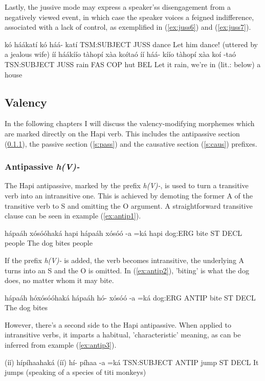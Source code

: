 \documentclass[a4paper, 12pt, oneside]{memoir}
\newcommand{\emh}[1]{\textit{#1}}
\begin{document}
Lastly, the jussive mode may express a speaker'ss disengagement from a negatively viewed event, in which case the speaker voices a feigned indifference, associated with a lack of control, as exemplified in (\ref{ex:juss6}) and (\ref{ex:juss7}).
\begin{examples}
    \ex \label{ex:juss6}
    \words kó háákatí
    \bits kó háá- katí
    \gloss TSM:SUBJECT JUSS dance
    \tr Let him dance! (uttered by a jealous wife) 
    \ex \label{ex:juss7}
    \words íí háákíío tàhopí xàa koítaó
    \bits íí háá- kíío tàhopí xàa koí -taó 
    \gloss TSN:SUBJECT JUSS rain FAS COP hut BEL
    \tr Let it rain, we're in (lit.: below) a house
\end{examples}
\subsection{Valency}\label{svvalency}
In the following chapters I will discuss the valency-modifying morphemes which are marked directly on the Hapi verb. This includes the antipassive section (\ref{s:antip}), the passive section (\ref{s:pass}) and the causative section (\ref{s:caus}) prefixes. 
\subsubsection{Antipassive \emh{h(V)-}}\label{s:antip}
The Hapi antipassive, marked by the prefix \emh{h(V)-}, is used to turn a transitive verb into an intransitive one. This is achieved by demoting the former A of the transitive verb to S and omitting the O argument. A straightforward transitive clause can be seen in example (\ref{ex:antip1}).
\begin{examples}
    \ex \label{ex:antip1}
    \words hápaáh xósóóhaká hapi
    \bits hápaáh xósóó -a =ká hapi
    \gloss dog:ERG bite ST DECL people
    \tr The dog bites people
\end{examples}
If the prefix \emh{h(V)-} is added, the verb becomes intransitive, the underlying A turns into an S and the O is omitted. In (\ref{ex:antip2}), 'biting' is what the dog does, no matter whom it may bite.
\begin{examples} 
    \ex \label{ex:antip2}
    \words hápaáh hóxósóóhaká
    \bits hápaáh hó- xósóó -a =ká 
    \gloss dog:ERG ANTIP bite ST DECL
    \tr The dog bites
\end{examples}
However, there's a second side to the Hapi antipassive. When applied to intransitive verbs, it imparts a habitual, 'characteristic' meaning, as can be inferred from example (\ref{ex:antip3}).
\begin{examples}
    \ex \label{ex:antip3}
    \words (íí) hípíhaahaká
    \bits (íí) hí- píhaa -a =ká
    \gloss TSN:SUBJECT ANTIP jump ST DECL
    \tr It jumps (speaking of a species of titi monkeys)
\end{examples}
\end{document}

